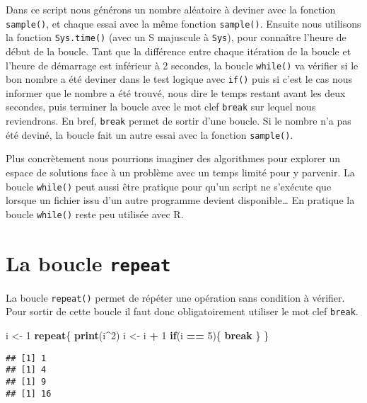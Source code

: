 \documentclass[]{book}
\newenvironment{Shaded}{\begin{snugshade}}{\end{snugshade}}
\newcommand{\KeywordTok}[1]{\textcolor[rgb]{0.13,0.29,0.53}{\textbf{#1}}}
\newcommand{\DecValTok}[1]{\textcolor[rgb]{0.00,0.00,0.81}{#1}}
\newcommand{\StringTok}[1]{\textcolor[rgb]{0.31,0.60,0.02}{#1}}
\newcommand{\ControlFlowTok}[1]{\textcolor[rgb]{0.13,0.29,0.53}{\textbf{#1}}}
\newcommand{\OperatorTok}[1]{\textcolor[rgb]{0.81,0.36,0.00}{\textbf{#1}}}
\newcommand{\NormalTok}[1]{#1}
\theoremstyle{definition}
\theoremstyle{definition}
\theoremstyle{definition}
\theoremstyle{remark}
\begin{document}
Dans ce script nous générons un nombre aléatoire à deviner avec la
fonction \texttt{sample()}, et chaque essai avec la même fonction
\texttt{sample()}. Ensuite nous utilisons la fonction
\texttt{Sys.time()} (avec un S majuscule à \texttt{Sys}), pour connaître
l'heure de début de la boucle. Tant que la différence entre chaque
itération de la boucle et l'heure de démarrage est inférieur à 2
secondes, la boucle \texttt{while()} va vérifier si le bon nombre a été
deviner dans le test logique avec \texttt{if()} puis si c'est le cas
nous informer que le nombre a été trouvé, nous dire le temps restant
avant les deux secondes, puis terminer la boucle avec le mot clef
\texttt{break} sur lequel nous reviendrons. En bref, \texttt{break}
permet de sortir d'une boucle. Si le nombre n'a pas été deviné, la
boucle fait un autre essai avec la fonction \texttt{sample()}.

Plus concrètement nous pourrions imaginer des algorithmes pour explorer
un espace de solutions face à un problème avec un temps limité pour y
parvenir. La boucle \texttt{while()} peut aussi être pratique pour qu'un
script ne s'exécute que lorsque un fichier issu d'un autre programme
devient disponible\ldots{} En pratique la boucle \texttt{while()} reste
peu utilisée avec R.

\hypertarget{l17repeat}{\section{\texorpdfstring{La boucle
\texttt{repeat}}{La boucle repeat}}\label{l17repeat}}

La boucle \texttt{repeat()} permet de répéter une opération sans
condition à vérifier. Pour sortir de cette boucle il faut donc
obligatoirement utiliser le mot clef \texttt{break}.

\begin{Shaded}
\begin{Highlighting}[]
\NormalTok{i <-}\StringTok{ }\DecValTok{1}
\ControlFlowTok{repeat}\NormalTok{\{}
  \KeywordTok{print}\NormalTok{(i}\OperatorTok{^}\DecValTok{2}\NormalTok{)}
\NormalTok{  i <-}\StringTok{ }\NormalTok{i }\OperatorTok{+}\StringTok{ }\DecValTok{1}
  \ControlFlowTok{if}\NormalTok{(i }\OperatorTok{==}\StringTok{ }\DecValTok{5}\NormalTok{)\{}
    \ControlFlowTok{break}
\NormalTok{  \}}
\NormalTok{\}}
\end{Highlighting}
\end{Shaded}

\begin{verbatim}
## [1] 1
## [1] 4
## [1] 9
## [1] 16
\end{verbatim}
\end{document}

